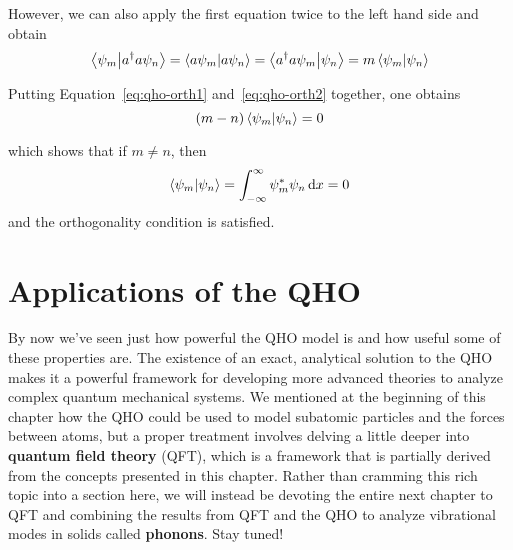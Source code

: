 However, we can also apply the first equation twice to the left hand side and obtain
\begin{equation}
	\braket{\psi_m}{a^{\dagger} a \psi_n} = \braket{a \psi_m}{a \psi_n} = \braket{a^{\dagger} a \psi_m}{\psi_n} = m\braket{\psi_m}{\psi_n} \label{eq:qho-orth2}
\end{equation}

Putting Equation~\ref{eq:qho-orth1} and~\ref{eq:qho-orth2} together, one obtains
\begin{equation*}
	(m-n)\braket{\psi_m}{\psi_n} = 0
\end{equation*}

which shows that if $m \neq n$, then 
\begin{equation*}
	\braket{\psi_m}{\psi_n} = \int_{-\infty}^{\infty} \psi_m^*\psi_n \dd{x} = 0
\end{equation*}
and the orthogonality condition is satisfied. 


\section[Applications]{Applications of the QHO}
By now we've seen just how powerful the QHO model is and how useful some of these properties are. The existence of an exact, analytical solution to the QHO makes it a powerful framework for developing more advanced theories to analyze complex quantum mechanical systems. We mentioned at the beginning of this chapter how the QHO could be used to model subatomic particles and the forces between atoms, but a proper treatment involves delving a little deeper into \textbf{quantum field theory} (QFT), which is a framework that is partially derived from the concepts presented in this chapter. Rather than cramming this rich topic into a section here, we will instead be devoting the entire next chapter to QFT and combining the results from QFT and the QHO to analyze vibrational modes in solids called \textbf{phonons}. Stay tuned! \par 

